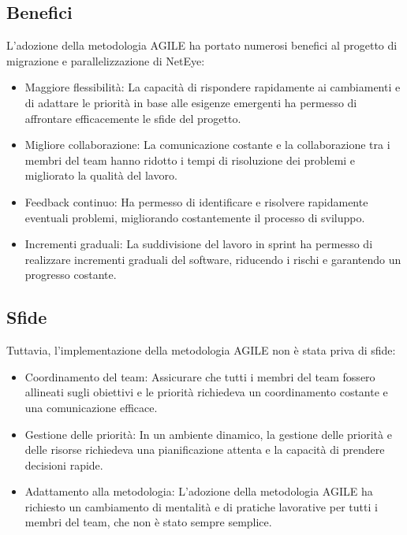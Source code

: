\subsection{Benefici}
\label{sub:benefici}

L'adozione della metodologia AGILE ha portato numerosi benefici al progetto di
migrazione e parallelizzazione di NetEye:
\begin{itemize}
  \item Maggiore flessibilità: La capacità di rispondere rapidamente ai
    cambiamenti e di adattare le priorità in base alle esigenze emergenti ha
    permesso di affrontare efficacemente le sfide del progetto.

  \item Migliore collaborazione: La comunicazione costante e la collaborazione
    tra i membri del team hanno ridotto i tempi di risoluzione dei problemi e
    migliorato la qualità del lavoro.

  \item Feedback continuo: Ha permesso di identificare e risolvere rapidamente
    eventuali problemi, migliorando costantemente il processo di sviluppo.

  \item Incrementi graduali: La suddivisione del lavoro in sprint ha permesso di
    realizzare incrementi graduali del software, riducendo i rischi e garantendo
    un progresso costante.
\end{itemize}

\subsection{Sfide}
\label{sub:sfide}

Tuttavia, l'implementazione della metodologia AGILE non è stata priva di sfide:
\begin{itemize}
  \item Coordinamento del team: Assicurare che tutti i membri del team fossero
    allineati sugli obiettivi e le priorità richiedeva un coordinamento costante
    e una comunicazione efficace.

  \item Gestione delle priorità: In un ambiente dinamico, la gestione delle priorità
    e delle risorse richiedeva una pianificazione attenta e la capacità di prendere
    decisioni rapide.

  \item Adattamento alla metodologia: L'adozione della metodologia AGILE ha
    richiesto un cambiamento di mentalità e di pratiche lavorative per tutti i
    membri del team, che non è stato sempre semplice.
\end{itemize}